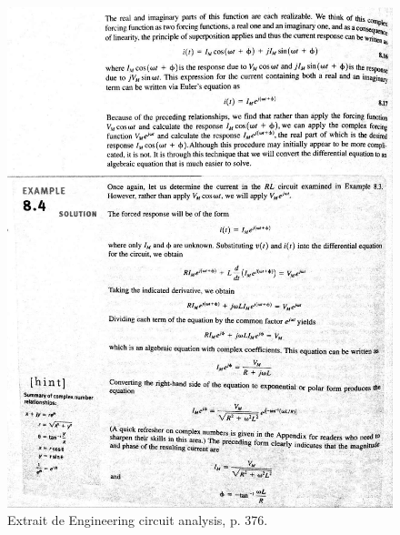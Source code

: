 \begin{figure}[h]
\begin{center}
\includegraphics[scale=0.5]{img/Irwin-2} 
\end{center}
\caption{Extrait de \og Engineering circuit analysis\fg, p. 376.  \cite{Irwin}}%
\label{Trace 7}
\end{figure}


\

\

 
 
 
 
 


